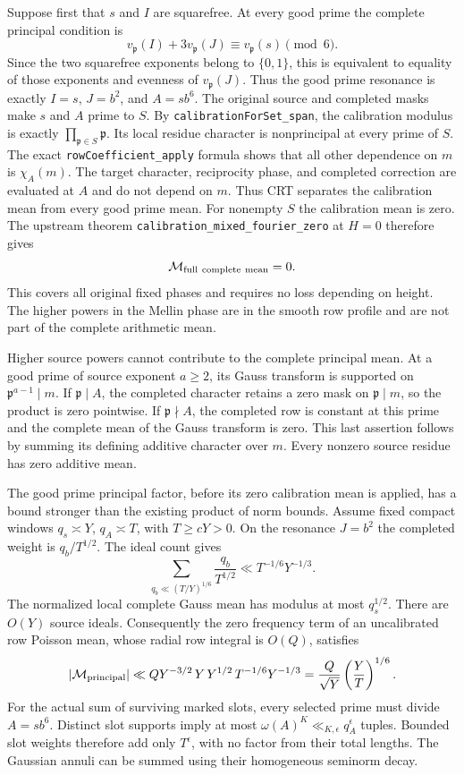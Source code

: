 \documentclass[11pt]{article}
\begin{document}
Suppose first that $s$ and $I$ are squarefree. At every good prime the
complete principal condition is
\[
 v_{\mathfrak p}(I)+3v_{\mathfrak p}(J)
        \equiv v_{\mathfrak p}(s)\pmod6.
\]
Since the two squarefree exponents belong to $\{0,1\}$, this is equivalent
to equality of those exponents and evenness of $v_{\mathfrak p}(J)$.
Thus the good prime resonance is exactly $I=s$, $J=b^2$, and $A=sb^6$.
The original source and completed masks make $s$ and $A$ prime to $S$.
By \texttt{calibrationForSet\_span}, the calibration modulus is exactly
$\prod_{\mathfrak p\in S}\mathfrak p$. Its local residue character is
nonprincipal at every prime of $S$. The exact
\texttt{rowCoefficient\_apply} formula shows that all other dependence on
$m$ is $\chi_A(m)$. The target character, reciprocity phase, and completed
correction are evaluated at $A$ and do not depend on $m$.
Thus CRT separates the calibration mean from every good prime mean.
For nonempty $S$ the calibration mean is zero. The upstream theorem
\texttt{calibration\_mixed\_fourier\_zero} at $H=0$ therefore gives
\[
 \mathcal M_{\rm full\ complete\ mean}=0.
\]
This covers all original fixed phases and requires no loss depending on
height. The higher powers in the Mellin phase are in the smooth row
profile and are not part of the complete arithmetic mean.

Higher source powers cannot contribute to the complete principal mean.
At a good prime of source exponent $a\ge2$, its Gauss transform is
supported on $\mathfrak p^{a-1}\mid m$. If $\mathfrak p\mid A$, the
completed character retains a zero mask on $\mathfrak p\mid m$, so the
product is zero pointwise. If $\mathfrak p\nmid A$, the completed row is
constant at this prime and the complete mean of the Gauss transform is
zero. This last assertion follows by summing its defining additive
character over $m$. Every nonzero source residue has zero additive mean.

The good prime principal factor, before its zero calibration mean is
applied, has a bound stronger than the existing product of norm bounds.
Assume fixed compact windows $q_s\asymp Y$, $q_A\asymp T$, with
$T\ge cY>0$. On the resonance $J=b^2$ the completed weight is
$q_b/T^{1/2}$. The ideal count gives
\[
 \sum_{q_b\ll(T/Y)^{1/6}}\frac{q_b}{T^{1/2}}
 \ll T^{-1/6}Y^{-1/3}.
\]
The normalized local complete Gauss mean has modulus at most $q_s^{1/2}$.
There are $O(Y)$ source ideals. Consequently the zero frequency term of
an uncalibrated row Poisson mean, whose radial row integral is $O(Q)$,
satisfies
\[
 |\mathcal M_{\rm principal}|
 \ll QY^{-3/2}\,Y\,Y^{1/2}\,T^{-1/6}Y^{-1/3}
 =\frac Q{\sqrt Y}\left(\frac YT\right)^{1/6}.
\]
For the actual sum of surviving marked slots, every selected prime must
divide $A=sb^6$. Distinct slot supports imply at most
$\omega(A)^K\ll_{K,\epsilon}q_A^\epsilon$ tuples. Bounded slot weights
therefore add only $T^\epsilon$, with no factor from their total lengths.
The Gaussian annuli can be summed using their homogeneous seminorm decay.
\end{document}
